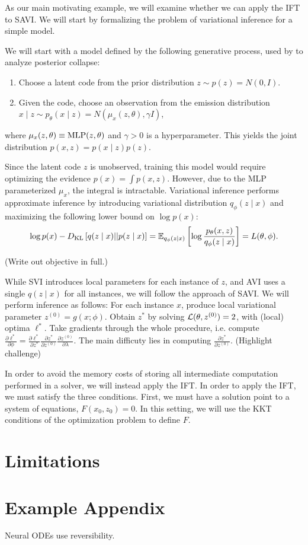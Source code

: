 \documentclass[11pt]{article}
\begin{document}
As our main motivating example, we will examine whether we can apply the IFT to SAVI.
We will start by formalizing the problem of variational inference for a simple model.

We will start with a model defined by the following generative process,
used by \citet{dai2020vae} to analyze posterior collapse:
\begin{enumerate}
\item Choose a latent code from the prior distribution $z \sim p(z) = N(0, I)$.
\item Given the code, choose an observation from the emission distribution
    $x \mid z \sim p_\theta(x \mid z) = N(\mu_x(z, \theta), \gamma I)$,
\end{enumerate}
where $\mu_x(z, \theta) \equiv \mathrm{MLP}(z, \theta)$ and $\gamma > 0$ is a hyperparameter.
This yields the joint distribution $p(x,z) = p(x\mid z)p(z)$.

Since the latent code $z$ is unobserved, training this model would require optimizing the
evidence $p(x) = \int p(x,z)$.
However, due to the MLP parameterized $\mu_x$, the integral is intractable.
Variational inference performs approximate inference by introducing variational distribution
$q_\phi(z \mid x)$ and maximizing the following lower bound on $\log p(x)$:
\begin{equation}
    \log p(x) - D_\mathrm{KL}\left[q(z \mid x) || p(z \mid x)\right]
    = \mathbb{E}_{q_\phi(z \mid x)}\left[\log \frac{p_\theta(x,z)}{q_\phi(z\mid x)}\right] = L(\theta, \phi).
\end{equation}

(Write out objective in full.)

While SVI introduces local parameters for each instance of $z$,
and AVI uses a single $q(z \mid x)$ for all instances,
we will follow the approach of SAVI.
We will perform inference as follows:
For each instance $x$, produce local variational parameter
$z^{(0)} = g(x; \phi)$.
Obtain $z^*$ by solving $\mathcal{L}(\theta, z^{(0)}) = 2$, with (local) optima $\ell^*$.
Take gradients through the whole procedure,
i.e. compute $\frac{\partial \ell^*}{\partial \phi}
= \frac{\partial\ell^*}{\partial z^*}\frac{\partial z^*}{\partial z^{(0)}}
\frac{\partial z^{(0)}}{\partial \lambda}$.
The main difficuty lies in computing $\frac{\partial z^*}{\partial z^{(0)}}$.
(Highlight challenge)

In order to avoid the memory costs of storing all intermediate computation performed
in a solver, we will instead apply the IFT.
In order to apply the IFT, we must satisfy the three conditions.
First, we must have a solution point to a system of equations, $F(x_0, z_0) = 0$.
In this setting, we will use the KKT conditions of the optimization problem to define $F$.

\section{Limitations}



\appendix

\section{Example Appendix}
\label{sec:appendix}

Neural ODEs use reversibility.
\end{document}
